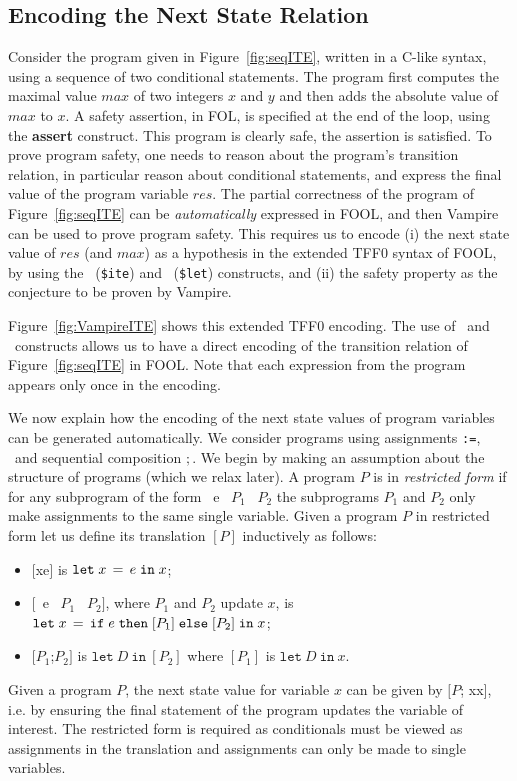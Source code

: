 \subsection{Encoding the Next State Relation}\label{sec:foolp}

Consider the program given in
Figure~\ref{fig:seqITE}, written in a C-like syntax, using a sequence
of two conditional statements.
The program first computes the maximal value $\mathit{max}$ of two integers $x$ and
$y$ and then adds the absolute value of $\mathit{max}$ to $x$. A safety assertion,
in FOL, is specified at the end of the loop, using the
{\bf assert} construct. This program is clearly safe, the
assertion is satisfied. To prove program safety, one needs to reason
about the program's transition relation, in particular reason about
conditional statements, and express the final value of
the program variable $\mathit{res}$. The partial correctness of the program
of Figure~\ref{fig:seqITE} can be \emph{automatically} expressed in FOOL,
and then Vampire can be used to prove program safety.
This requires us to encode (i)
the next state value of $\mathit{res}$ (and $\mathit{max}$) as a hypothesis
in the extended TFF0 syntax of FOOL,
by using the \ITE\ ({\tt \$ite}) and \LETIN\ ({\tt \$let})
constructs, and (ii)
the safety property as the conjecture to be proven by Vampire.

Figure~\ref{fig:VampireITE} shows this extended TFF0 encoding.
The use of \ITE\ and \LETIN\ constructs allows us to have a
direct  encoding of the  transition relation of
Figure~\ref{fig:seqITE} in FOOL. Note that each expression from the program appears only once in the encoding.

We now explain how the encoding of the next state values of program
variables can be generated automatically.
We consider programs using assignments \texttt{:=},
\ITE\ and sequential composition $;$.
We begin by making an assumption about the structure of programs (which we relax later). A program $P$ is in \emph{restricted form} if for any subprogram of the form \IF\ e \THEN\ $P_1$ \ELSE\ $P_2$ the subprograms $P_1$ and $P_2$ only make assignments to the same single variable. Given a program $P$ in restricted form let us define its translation $[P]$ inductively as follows:
%
\begin{itemize}
	\item $[$x\ASS e$]$ is $\mathtt{let}\;{x}\,=\,{e}\;\allowbreak\mathtt{in}\;{x}$;
	\item $[$\IF\ e \THEN\ $P_1$ \ELSE\ $P_2]$, where $P_1$ and
          $P_2$ update $x$,  is $\mathtt{let}\;{x}\,=\,{\mathtt{if}\;{e}\;\allowbreak\mathtt{then}\;{[P_1]}\;\allowbreak\mathtt{else}\;{[P_2]}}\;\allowbreak\mathtt{in}\;{x}$;
	\item $[P_1$;$P_2]$ is $\mathtt{let}~D~\mathtt{in}~[P_2]$ where $[P_1]$ is $\mathtt{let}~D~\mathtt{in}~x$.
\end{itemize}
%
Given a program $P$, the next state value for variable $x$ can be
given by $[P$; x\ASS x$]$,
i.e. by ensuring the final statement of the program updates the
variable of interest.
The restricted form is required as conditionals must be viewed
as assignments in the translation and assignments can only be made to single variables.

